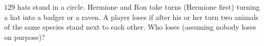 $129$ hats stand in a circle. Hermione and Ron take turns (Hermione first) turning a hat into a badger or a raven. A player loses if after his or her turn two animals of the same species stand next to each other. Who loses (assuming nobody loses on purpose)?
